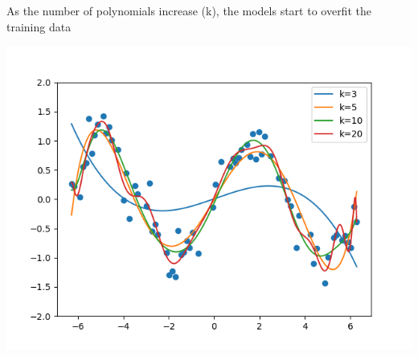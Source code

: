 \begin{answer}
As the number of polynomials increase (k), the models start to overfit the training data

\includegraphics{part_c.png}

\end{answer}
